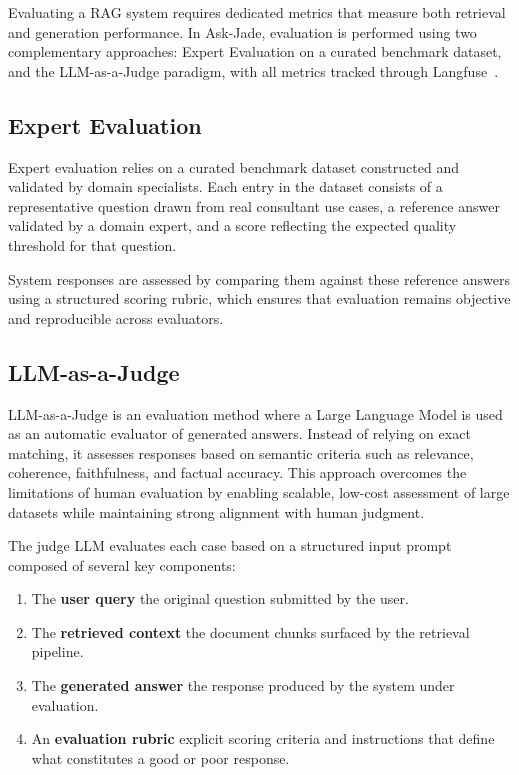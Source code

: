 Evaluating a RAG system requires dedicated metrics that measure both
retrieval and generation performance. In Ask-Jade, evaluation is performed
using two complementary approaches: Expert Evaluation on a
curated benchmark dataset, and the LLM-as-a-Judge paradigm,
with all metrics tracked through Langfuse~\cite{langfuse}.


\subsection{Expert Evaluation}
\label{sec:expert_eval}
Expert evaluation relies on a curated benchmark dataset constructed and
validated by domain specialists. Each entry in the dataset consists of
a representative question drawn from real consultant use cases, a
reference answer validated by a domain expert, and a score reflecting
the expected quality threshold for that question.

System responses are assessed by comparing them against these reference
answers using a structured scoring rubric, which ensures that evaluation
remains objective and reproducible across evaluators.

\subsection{LLM-as-a-Judge}
\label{sec:llm_as_judge}
LLM-as-a-Judge is an evaluation method where a Large Language Model is used as an automatic evaluator of generated answers. Instead of relying on exact matching, it assesses responses based on semantic criteria such as relevance, coherence, faithfulness, and factual accuracy. This approach overcomes the limitations of human evaluation by enabling scalable, low-cost assessment of large datasets while maintaining strong alignment with human judgment.


The judge LLM evaluates each case based on a structured input prompt composed of several key components:

\begin{enumerate}
  \item The \textbf{user query} the original question submitted
        by the user.
  \item The \textbf{retrieved context} the document chunks surfaced
        by the retrieval pipeline.
  \item The \textbf{generated answer} the response produced by the
        system under evaluation.
  \item An \textbf{evaluation rubric} explicit scoring criteria
        and instructions that define what constitutes a good or poor
        response.
\end{enumerate}


